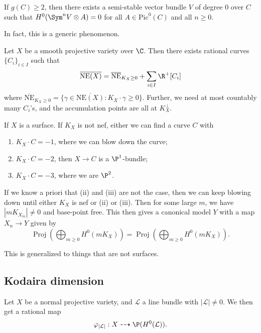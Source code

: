 \documentclass[a4paper]{article}
\newcommand\Pic{\mathrm{Pic}}
\newcommand\NE{\mathrm{NE}}
\DeclareMathOperator\Proj{Proj}
\begin{document}
\begin{thm}[Hartshorne]
  If $g(C) \geq 2$, then there exists a semi-stable vector bundle $V$ of degree $0$ over $C$ such that $H^0(\Sym^nV \otimes A) = 0$ for all $A \in \Pic^0(C)$ and all $n \geq 0$.\fakeqed
\end{thm}
In fact, this is a generic phenomenon.

\begin{thm}
  Let $X$ be a smooth projective variety over $\C$. Then there exists rational curves $\{C_i\}_{i \in I}$ such that
  \[
    \overline{\NE(X)} = \overline{\NE}_{K_X \geq 0} + \sum_{i \in I} \R^+ [C_i]
  \]
  where $\overline{\NE}_{K_X \geq 0} = \{\gamma \in \overline{\NE(X)} : K_X \cdot \gamma \geq 0\}$. Further, we need at most countably many $C_i$'s, and the accumulation points are all at $K_X^\perp$.
\end{thm}

\begin{eg}
  If $X$ is a surface. If $K_X$ is not nef, either we can find a curve $C$ with
  \begin{enumerate}
    \item $K_X \cdot C = -1$, where we can blow down the curve;
    \item $K_X \cdot C = -2$, then $X \to C $ is a $\P^1$-bundle;
    \item $K_X \cdot C = -3$, where we are $\P^2$.
  \end{enumerate}
  If we know a priori that (ii) and (iii) are not the case, then we can keep blowing down until either $K_X$ is nef or (ii) or (iii). Then for some large $m$, we have $|m K_{X_m}| \not= 0$ and base-point free. This then gives a canonical model $Y$ with a map $X_n \to Y$ given by
  \[
    \Proj\left(\bigoplus_{m \geq 0} H^0(mK_X)\right) = \Proj \left(\bigoplus_{m \geq 0} H^0 (mK_X)\right).
  \]
\end{eg}
This is generalized to things that are not surfaces. %

\subsection{Kodaira dimension}
Let $X$ be a normal projective variety, and $\mathcal{L}$ a line bundle with $|\mathcal{L}| \not= 0$. We then get a rational map
\[
  \varphi_{|\mathcal{L}|}: X \dashrightarrow \P(H^0(\mathcal{L})).
\]
\end{document}
